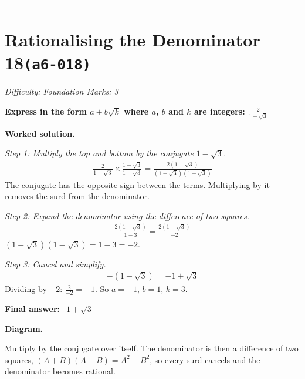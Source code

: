 \documentclass[11pt]{article}
\newcommand{\question}[1]{\par\medskip\noindent\textbf{#1}\par}
\begin{document}
\medskip\hrule

\section*{Rationalising the Denominator 18\quad\small\texttt{(a6-018)}}
\textit{Difficulty: Foundation \quad\textbar\quad Marks: 3}

\question{Express in the form \( a + b\sqrt{k} \) where \( a \), \( b \) and \( k \) are integers: \( \frac{2}{1 + \sqrt{3}} \)}

\textbf{Worked solution.}

\textit{Step 1: Multiply the top and bottom by the conjugate \( 1 - \sqrt{3} \).}
\[\begin{gathered}
\frac{2}{1 + \sqrt{3}} \times \frac{1 - \sqrt{3}}{1 - \sqrt{3}} = \frac{2(1 - \sqrt{3})}{(1 + \sqrt{3})(1 - \sqrt{3})}
\end{gathered}\]
The conjugate has the opposite sign between the terms. Multiplying by it removes the surd from the denominator.

\textit{Step 2: Expand the denominator using the difference of two squares.}
\[\begin{gathered}
\frac{2(1 - \sqrt{3})}{1 - 3} = \frac{2(1 - \sqrt{3})}{-2}
\end{gathered}\]
\( (1 + \sqrt{3})(1 - \sqrt{3}) = 1 - 3 = -2 \).

\textit{Step 3: Cancel and simplify.}
\[\begin{gathered}
-(1 - \sqrt{3}) = -1 + \sqrt{3}
\end{gathered}\]
Dividing by \( -2 \): \( \frac{2}{-2} = -1 \). So \( a = -1 \), \( b = 1 \), \( k = 3 \).

\begin{answerbox}
\textbf{Final answer:}\quad \(\displaystyle -1 + \sqrt{3}\)
\end{answerbox}
\textbf{Diagram.}

\begin{center}
\end{center}
\small Multiply by the conjugate over itself. The denominator is then a difference of two squares, $(A+B)(A-B)=A^{2}-B^{2}$, so every surd cancels and the denominator becomes rational.\normalsize
\end{document}
